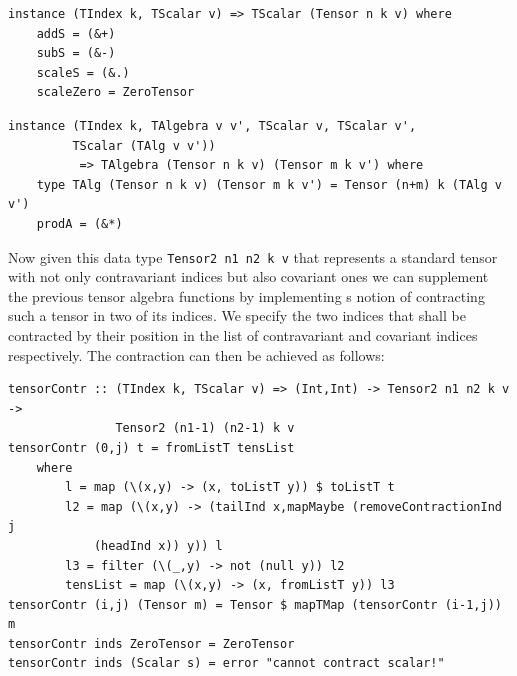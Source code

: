 \documentclass[a4paper,12pt, DIV=14, BCOR=5mm, twoside, headsepline]{scrbook}
\begin{document}
\begin{samepage} 
\begin{verbatim}
instance (TIndex k, TScalar v) => TScalar (Tensor n k v) where
    addS = (&+)
    subS = (&-)
    scaleS = (&.)
    scaleZero = ZeroTensor
\end{verbatim} 
\end{samepage}

\begin{samepage} 
\begin{verbatim}
instance (TIndex k, TAlgebra v v', TScalar v, TScalar v', 
         TScalar (TAlg v v')) 
          => TAlgebra (Tensor n k v) (Tensor m k v') where 
    type TAlg (Tensor n k v) (Tensor m k v') = Tensor (n+m) k (TAlg v v')
    prodA = (&*)
\end{verbatim} 
\end{samepage}

Now given this data type \texttt{Tensor2 n1 n2 k v} that represents a standard tensor with not only contravariant indices but also covariant ones we can supplement the previous tensor algebra functions by implementing s notion of contracting such a tensor in two of its indices.
We specify the two indices that shall be contracted by their position in the list of contravariant and covariant indices respectively. The contraction can then be achieved as follows:

\begin{samepage} 
\begin{verbatim}
tensorContr :: (TIndex k, TScalar v) => (Int,Int) -> Tensor2 n1 n2 k v ->
               Tensor2 (n1-1) (n2-1) k v 
tensorContr (0,j) t = fromListT tensList 
    where
        l = map (\(x,y) -> (x, toListT y)) $ toListT t
        l2 = map (\(x,y) -> (tailInd x,mapMaybe (removeContractionInd j
            (headInd x)) y)) l
        l3 = filter (\(_,y) -> not (null y)) l2 
        tensList = map (\(x,y) -> (x, fromListT y)) l3
tensorContr (i,j) (Tensor m) = Tensor $ mapTMap (tensorContr (i-1,j)) m
tensorContr inds ZeroTensor = ZeroTensor 
tensorContr inds (Scalar s) = error "cannot contract scalar!"
\end{verbatim} 
\end{samepage}
\end{document}
